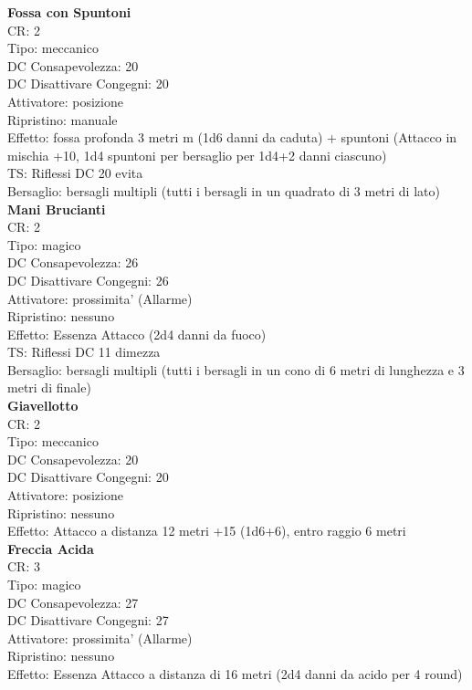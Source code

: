 \documentclass[a4paper,11pt,twoside,openany]{book}
\begin{document}
\begin{multicols}{2}
\textbf{Fossa con Spuntoni}\\
CR: 2 \\
Tipo: meccanico \\
DC Consapevolezza: 20 \\
DC Disattivare Congegni: 20 \\
Attivatore: posizione \\
Ripristino: manuale \\
Effetto: fossa profonda 3 metri m (1d6 danni da caduta) + spuntoni (Attacco in mischia +10, 1d4 spuntoni per bersaglio per 1d4+2 danni ciascuno) \\
TS: Riflessi DC 20 evita \\
Bersaglio: bersagli multipli (tutti i bersagli in un quadrato di 3 metri di lato)\\

\textbf{Mani Brucianti}\\
CR: 2 \\
Tipo: magico \\
DC Consapevolezza: 26 \\
DC Disattivare Congegni: 26 \\
Attivatore: prossimita' (Allarme) \\
Ripristino: nessuno \\
Effetto: Essenza Attacco (2d4 danni da fuoco) \\
TS: Riflessi DC 11 dimezza \\
Bersaglio: bersagli multipli (tutti i bersagli in un cono di 6 metri di lunghezza e 3 metri di finale)\\

\textbf{Giavellotto}\\
CR: 2 \\
Tipo: meccanico \\
DC Consapevolezza: 20 \\
DC Disattivare Congegni: 20 \\
Attivatore: posizione \\
Ripristino: nessuno \\
Effetto: Attacco a distanza 12 metri +15 (1d6+6), entro raggio 6 metri\\

\textbf{Freccia Acida}\\
CR: 3 \\
Tipo: magico \\
DC Consapevolezza: 27 \\
DC Disattivare Congegni: 27 \\
Attivatore: prossimita' (Allarme) \\
Ripristino: nessuno \\
Effetto: Essenza Attacco a distanza di 16 metri (2d4 danni da acido per 4 round)\\


\end{multicols}
\end{document}
